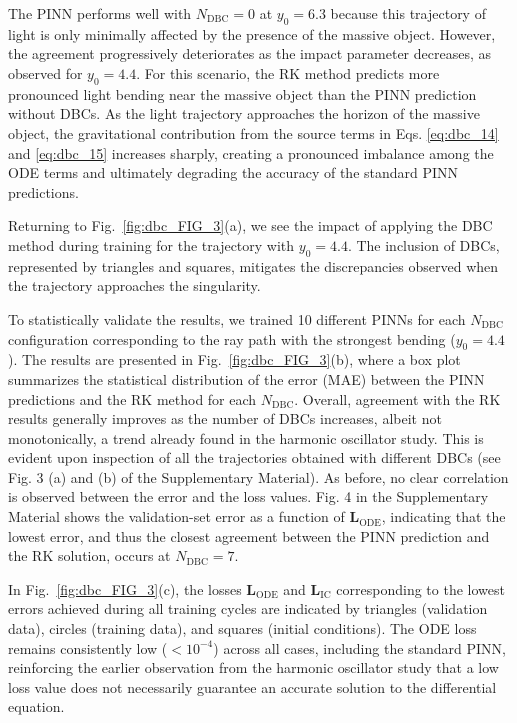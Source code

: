The PINN performs well with $N_{\mathrm{DBC}} = 0$ at $y_0 = 6.3$ because this trajectory of light is only minimally affected by the presence of the massive object. However, the agreement progressively deteriorates as the impact parameter decreases, as observed for $y_0 = 4.4$. For this scenario, the RK method predicts more pronounced light bending near the massive object than the PINN prediction without DBCs. As the light trajectory approaches the horizon of the massive object, the gravitational contribution from the source terms in Eqs. \ref{eq:dbc_14} and \ref{eq:dbc_15} increases sharply, creating a pronounced imbalance among the ODE terms and ultimately degrading the accuracy of the standard PINN predictions.

Returning to Fig.~\ref{fig:dbc_FIG_3}(a), we see the impact of applying the DBC method during training for the trajectory with $y_0 = 4.4$. The inclusion of DBCs, represented by triangles and squares, mitigates the discrepancies observed when the trajectory approaches the singularity.

To statistically validate the results, we trained 10 different PINNs for each $N_{\mathrm{DBC}}$ configuration corresponding to the ray path with the strongest bending ($y_0 = 4.4$). The results are presented in Fig.~\ref{fig:dbc_FIG_3}(b), where a box plot summarizes the statistical distribution of the error (MAE) between the PINN predictions and the RK method for each $N_{\mathrm{DBC}}$. Overall, agreement with the RK results generally improves as the number of DBCs increases, albeit not monotonically, a trend already found in the harmonic oscillator study. This is evident upon inspection of all the trajectories obtained with different DBCs (see Fig. 3 (a) and (b) of the Supplementary Material). As before, no clear correlation is observed between the error and the loss values. Fig. 4 in the Supplementary Material shows the validation-set error as a function of $\mathbf{L}_{\mathrm{ODE}}$, indicating that the lowest error, and thus the closest agreement between the PINN prediction and the RK solution, occurs at $N_{\mathrm{DBC}} = 7$.

In Fig.~\ref{fig:dbc_FIG_3}(c), the losses $\mathbf{L}_{\mathrm{ODE}}$ and $\mathbf{L}_{\mathrm{IC}}$ corresponding to the lowest errors achieved during all training cycles are indicated by triangles (validation data), circles (training data), and squares (initial conditions). The ODE loss remains consistently low ($<10^{-4}$) across all cases, including the standard PINN, reinforcing the earlier observation from the harmonic oscillator study that a low loss value does not necessarily guarantee an accurate solution to the differential equation.

